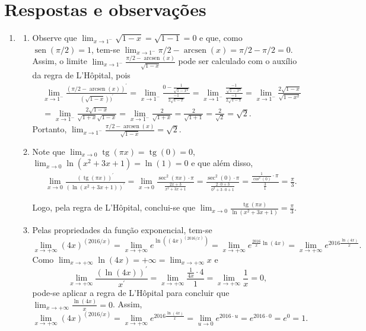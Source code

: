 \documentclass[12pt,a4paper]{article}
\newcommand*\sen{\operatorname{sen}}
\newcommand*\tg{\operatorname{tg}}
\newcommand*\arcsen{\operatorname{arcsen}}
\begin{document}
\section*{Respostas e observações}
\begin{enumerate}
\item
\begin{enumerate}
\item Observe que $\lim_{x\to1^-} \sqrt{1-x} = \sqrt{1-1} = 0$ e que, como $\sen(\pi/2) = 1$, tem-se $\lim_{x\to1^-} \pi/2 - \arcsen(x) = \pi/2 - \pi/2 = 0$. Assim, o limite $\displaystyle\lim_{x\to1^-} \frac{\pi/2 - \arcsen(x)}{\sqrt{1-x}}$ pode ser calculado com o auxílio da regra de L'Hôpital, pois
\begin{align*}
& \lim_{x\to1^-} \frac{(\pi/2 - \arcsen(x))^\prime}{(\sqrt{1-x}))^\prime}
= \lim_{x\to1^-} \frac{0 - \frac{1}{\sqrt{1-x^2}}}{\frac{-1}{2\sqrt{1-x}}}
= \lim_{x\to1^-} \frac{\frac{-1}{\sqrt{1-x^2}}}{\frac{-1}{2\sqrt{1-x}}}
= \lim_{x\to1^-} \frac{2\sqrt{1-x}}{\sqrt{1-x^2}} \\
& = \lim_{x\to1^-} \frac{2\sqrt{1-x}}{\sqrt{1+x}\sqrt{1-x}}
= \lim_{x\to1^-} \frac{2}{\sqrt{1+x}}
= \frac{2}{\sqrt{1+1}}
= \frac{2}{\sqrt{2}}
= \sqrt{2}.
\end{align*}
Portanto, $\displaystyle\lim_{x\to1^-} \frac{\pi/2 - \arcsen(x)}{\sqrt{1-x}} = \sqrt{2}$.
\item Note que $\lim_{x\to 0} \tg(\pi x) = \tg(0) = 0$, $\lim_{x\to 0} \ln{(x^2+3x+1)} = \ln(1) = 0$ e que além disso,
\begin{align*}
& \lim_{x\to 0} \frac{( \tg(\pi x) )^\prime}{ ( \ln{(x^2+3x+1)} )^\prime}
= \lim_{x\to 0} \frac{ \sec^2(\pi x) \cdot \pi}{ \frac{2x+3}{x^2+3x+1} }
= \frac{ \sec^2(0) \cdot \pi}{ \frac{2 \cdot 0 +3}{0^2+3 \cdot 0 +1} }
= \frac{ \frac{1}{\cos^2(0)} \cdot \pi}{ \frac{3}{1} }
= \frac{ \pi }{ 3 }.
\end{align*}

Logo, pela regra de L'Hôpital, conclui-se que $\displaystyle\lim_{x\to 0} \frac{\tg(\pi x)}{\ln{(x^2+3x+1)}} = \frac{ \pi }{ 3 }$.

\item Pelas propriedades da função exponencial, tem-se
\[
\lim_{x\to +\infty} (4x)^{(2016/x)}
= \lim_{x\to +\infty} e^{ \ln \left( (4x)^{(2016/x)} \right) }
= \lim_{x\to +\infty} e^{ \frac{ 2016 }{x} \ln(4x) }
= \lim_{x\to +\infty} e^{ 2016 \frac{ \ln(4x) }{x} }.
\]
Como $\lim_{x\to +\infty} \ln(4x) = +\infty = \lim_{x\to +\infty} x$ e
\[
\lim_{x\to +\infty} \frac{ ( \ln(4x) )^\prime }{ x^\prime }
= \lim_{x\to +\infty} \frac{ \frac{1}{4x} \cdot 4 }{ 1 }
= \lim_{x\to +\infty} \frac{1}{x}
= 0,
\]
pode-se aplicar a regra de L'Hôpital para concluir que $\lim_{x\to +\infty} \frac{ \ln(4x) }{ x } = 0$. Assim,
\[
\lim_{x\to +\infty} (4x)^{(2016/x)}
= \lim_{x\to +\infty} e^{ 2016 \frac{ \ln(4x) }{x} }
= \lim_{u \to 0} e^{ 2016 \cdot u }
= e^{ 2016 \cdot 0 }
= e^0
= 1.
\]



\end{enumerate}
\end{enumerate}
\end{document}
